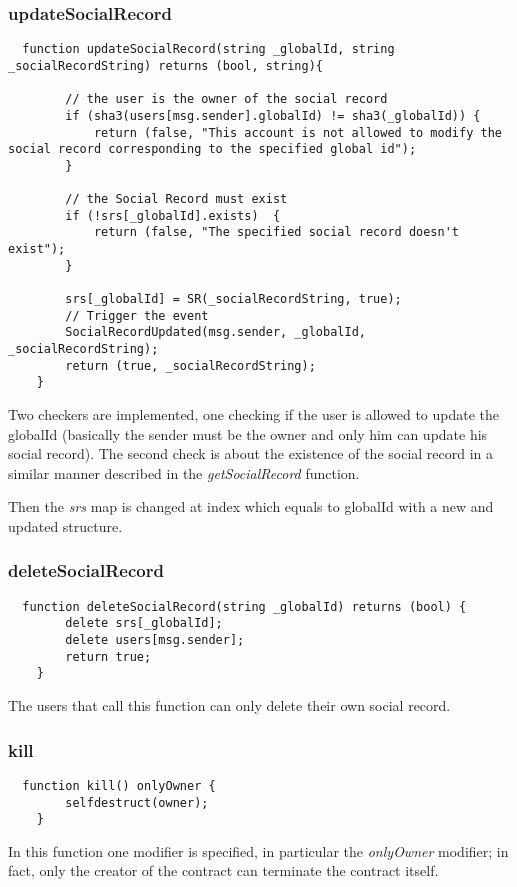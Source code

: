 \subsubsection{updateSocialRecord}
\begin{lstlisting}
  function updateSocialRecord(string _globalId, string _socialRecordString) returns (bool, string){

        // the user is the owner of the social record
        if (sha3(users[msg.sender].globalId) != sha3(_globalId)) {
            return (false, "This account is not allowed to modify the social record corresponding to the specified global id");
        }

        // the Social Record must exist
        if (!srs[_globalId].exists)  {
            return (false, "The specified social record doesn't exist");
        }

        srs[_globalId] = SR(_socialRecordString, true);
        // Trigger the event
        SocialRecordUpdated(msg.sender, _globalId, _socialRecordString);
        return (true, _socialRecordString);
    }
\end{lstlisting}

Two checkers are implemented, one checking if the user is allowed to update the globalId (basically the sender must be the owner and only him can update his social record).
The second check is about the existence of the social record in a similar manner described  in the \textit{getSocialRecord} function.

Then the \textit{srs} map is changed at index which equals to globalId with a new and updated structure.

\subsubsection{deleteSocialRecord}
\begin{lstlisting}
  function deleteSocialRecord(string _globalId) returns (bool) {
        delete srs[_globalId];
        delete users[msg.sender];
        return true;
    }
\end{lstlisting}
The users that call this function can only delete their own social record.

\subsubsection{kill}
\begin{lstlisting}
  function kill() onlyOwner {
        selfdestruct(owner);
    }
\end{lstlisting}
In this function one modifier is specified, in particular the \textit{onlyOwner} modifier; in fact, only the creator of the contract can terminate the contract itself. 


